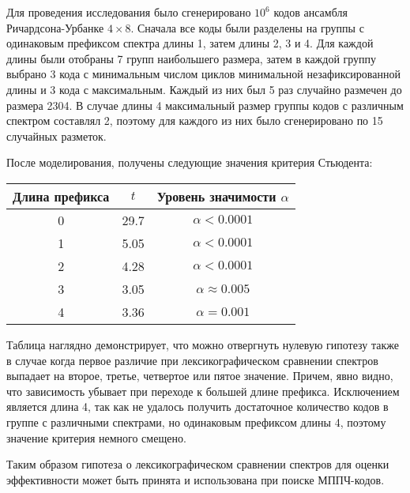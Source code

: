  Для проведения исследования было сгенерировано $10^6$ кодов ансамбля Ричардсона-Урбанке $4 \times 8$.
 Сначала все коды были разделены на группы с одинаковым префиксом спектра длины 1, затем длины 2, 3 и 4.
 Для каждой длины были отобраны 7 групп наибольшего размера, затем в каждой группу выбрано 3 кода с минимальным
 числом циклов минимальной незафиксированной длины и 3 кода с максимальным. Каждый из них
 был 5 раз случайно размечен до размера 2304. В случае длины 4 максимальный размер группы кодов 
 с различным спектром составлял 2, поэтому для каждого из них было сгенерировано по 15 случайных разметок. 

После моделирования, получены следующие значения критерия Стьюдента:

\begin{tabular}{|c|c|c|}
	\hline
	Длина префикса & $t$ & Уровень значимости $\alpha$\\
	\hline
	0 & 29.7 &  $\alpha < 0.0001$\\
	\hline
	1 & 5.05 &  $\alpha < 0.0001$\\
	\hline
	2 & 4.28 & $\alpha < 0.0001$ \\
	\hline
	3 & 3.05 & $\alpha \approx 0.005$ \\
	\hline
	4 & 3.36 & $\alpha = 0.001$ \\
	\hline
\end{tabular}

Таблица наглядно демонстрирует, что можно отвергнуть нулевую гипотезу также в случае когда первое
различие при лексикографическом сравнении спектров выпадает на второе, третье, четвертое или пятое значение.
Причем, явно видно, что зависимость убывает при переходе к большей длине префикса. Исключением
является длина 4, так как не удалось получить достаточное количество кодов в группе с различными 
спектрами, но одинаковым префиксом длины 4, поэтому значение критерия немного смещено.

Таким образом гипотеза о лексикографическом сравнении спектров для оценки эффективности может быть
принята и использована при поиске МППЧ-кодов.



















































